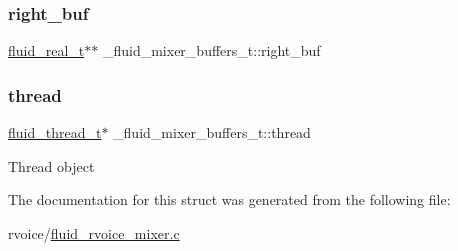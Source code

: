 \subsubsection{\texorpdfstring{right\+\_\+buf}{right\_buf}}
{\footnotesize\ttfamily \hyperlink{fluidsynth__priv_8h_a9e96f0917747b69cabb7c671bc693dbb}{fluid\+\_\+real\+\_\+t}$\ast$$\ast$ \+\_\+fluid\+\_\+mixer\+\_\+buffers\+\_\+t\+::right\+\_\+buf}

\mbox{\label{struct__fluid__mixer__buffers__t_ae1b5c3828544d2d5b2ecf90a5d5363f6}} 
\subsubsection{\texorpdfstring{thread}{thread}}
{\footnotesize\ttfamily \hyperlink{fluid__sys_8h_a60a6466e68a45b0f0709f1ebaa7e6f85}{fluid\+\_\+thread\+\_\+t}$\ast$ \+\_\+fluid\+\_\+mixer\+\_\+buffers\+\_\+t\+::thread}

Thread object 

The documentation for this struct was generated from the following file\+:\begin{DoxyCompactItemize}
\item 
rvoice/\hyperlink{fluid__rvoice__mixer_8c}{fluid\+\_\+rvoice\+\_\+mixer.\+c}\end{DoxyCompactItemize}
